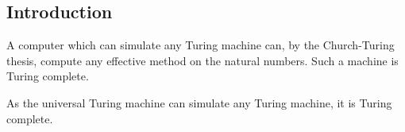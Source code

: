 
\subsection{Introduction}

A computer which can simulate any Turing machine can, by the Church-Turing thesis, compute any effective method on the natural numbers. Such a machine is Turing complete.

As the universal Turing machine can simulate any Turing machine, it is Turing complete.
